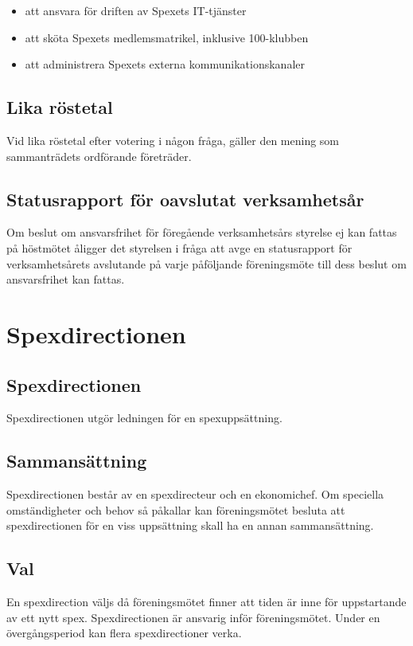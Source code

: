\documentclass[a4paper]{article}
\begin{document}
\begin{itemize}
  \item att ansvara för driften av Spexets IT-tjänster
  \item att sköta Spexets medlemsmatrikel, inklusive 100-klubben
  \item att administrera Spexets externa kommunikationskanaler
\end{itemize}

\subsection{Lika röstetal}
Vid lika röstetal efter votering i någon fråga, gäller den mening som sammanträdets ordförande företräder.

\subsection{Statusrapport för oavslutat verksamhetsår}
Om beslut om ansvarsfrihet för föregående verksamhetsårs styrelse ej kan fattas på höstmötet åligger det styrelsen i fråga att avge en statusrapport för verksamhetsårets avslutande på varje påföljande föreningsmöte till dess beslut om ansvarsfrihet kan fattas.

\section{Spexdirectionen}
\label{section:spexdirectionen}

\subsection{Spexdirectionen}
Spexdirectionen utgör ledningen för en spexuppsättning.

\subsection{Sammansättning}
Spexdirectionen består av en spexdirecteur och en ekonomichef.\newline
\newline
Om speciella omständigheter och behov så påkallar kan föreningsmötet besluta att spexdirectionen för en viss uppsättning skall ha en annan sammansättning.

\subsection{Val}
En spexdirection väljs då föreningsmötet finner att tiden är inne för uppstartande av ett nytt spex. Spexdirectionen är ansvarig inför föreningsmötet. Under en övergångsperiod kan flera spexdirectioner verka.
\end{document}
